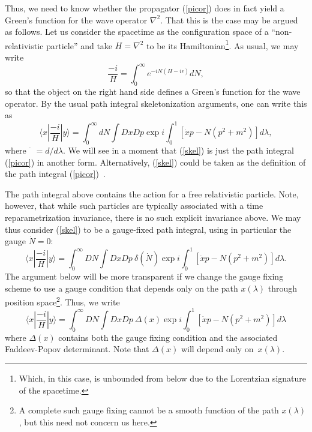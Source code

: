 \documentclass[a4paper,12pt]{article}
\begin{document}
Thus, we need to know whether the propagator (\ref{picor}) does in
fact yield a Green's function for the wave operator $\nabla^2$.  That
this is the case may be argued as follows.  Let us consider the
spacetime as the configuration space of a ``non-relativistic
particle'' and take $H = \nabla^2$ to be its
Hamiltonian\footnote{Which, in this case, is unbounded from below due
  to the Lorentzian signature of the spacetime.}.  As usual, we may
write
\begin{equation}
\frac{-i}{H} = \int_0^\infty e^{- iN(H - i \epsilon)} dN,
\end{equation}
so that the object on the right hand side defines a
Green's function for the wave operator.  By the usual path
integral skeletonization
arguments, one can write this as
\begin{equation} 
\label{skel}
\langle x| \frac{-i}{H}| y \rangle = \int_0^\infty  dN
\int Dx Dp \exp{i \int_0^1 [\dot{x}p - N(p^2 + m^2)]d\lambda}, 
\end{equation}
where $\dot{\phantom{x}} = d/d\lambda$.  We will see in a moment that
(\ref{skel}) is just the path integral (\ref{picor}) in another
form. Alternatively, (\ref{skel}) could be taken as the definition of
the path integral (\ref{picor})~\cite{teitel-pi1,henn-teitel,piINST}.

The path integral above contains the action for a free relativistic
particle.  Note, however, that while such particles are typically
associated with a time reparametrization invariance, there is no such
explicit invariance above.  We may thus consider (\ref{skel}) to be a
gauge-fixed path integral, using in particular the gauge $\dot{N}=0$:
\begin{equation}
\label{skel2}
\langle x| \frac{-i}{H}| y \rangle = \int_0^\infty  DN
\int Dx Dp \ \delta(\dot N) \exp{i \int_0^1 [\dot{x}p - N(p^2 + m^2)]
d\lambda}.
\end{equation}
The argument below will be more transparent if we change the gauge
fixing scheme to use a gauge condition that depends only
on the path $x(\lambda)$ through position space\footnote{A
complete such gauge fixing cannot be a smooth function of the
path $x(\lambda)$, but this need not concern us here.}.  Thus, 
we write
\begin{equation}
\label{skel3}
\langle x| \frac{-i}{H}| y \rangle = \int_0^\infty  DN
\int Dx Dp \  \Delta(x) \exp{i \int_0^1 [\dot{x}p - N(p^2 + m^2)]
d\lambda}
\end{equation}
where $\Delta(x)$ contains both the gauge fixing condition
and the associated Faddeev-Popov determinant.  Note that $\Delta(x)$
will depend only on~$x(\lambda)$.
\end{document}
